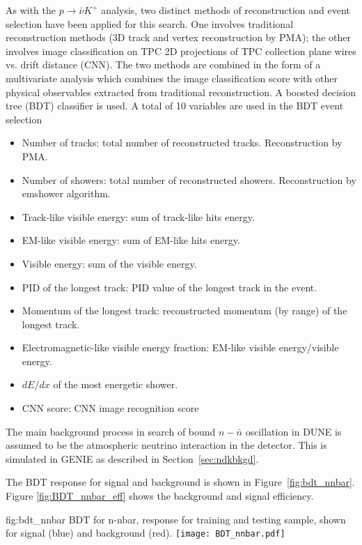As with the $p\rightarrow \bar{\nu} K^{+}$ analysis, two distinct methods of reconstruction and event selection have been applied for this search. One involves traditional reconstruction methods (3D track and vertex reconstruction by PMA); the other involves image classification on TPC 2D projections of TPC collection plane wires vs. drift distance (CNN). The two methods are combined in the form of a multivariate analysis which combines the image classification score with other physical observables extracted from traditional reconstruction.  A boosted decision tree (BDT) classifier is used. A total of 10 variables are used in the BDT event selection
 \begin{itemize}
  \item Number of tracks: total number of reconstructed tracks. Reconstruction by PMA.
  \item Number of showers: total number of reconstructed showers. Reconstruction by emshower algorithm. 
  \item Track-like visible energy: sum of track-like hits energy.
  \item EM-like visible energy: sum of EM-like hits energy.
  \item Visible energy: sum of the visible energy.
  \item PID of the longest track: PID value of the longest track in the event.
  \item Momentum of the longest track: reconstructed momentum (by range) of the longest track.
  \item Electromagnetic-like visible energy fraction: EM-like visible energy/visible energy.
  \item $dE/dx$ of the most energetic shower. 
  \item CNN score: CNN image recognition score
 \end{itemize}

The main background process in search of bound $n-\bar{n}$ oscillation in DUNE is assumed to be the atmospheric neutrino interaction in the detector.  This is simulated in GENIE as described in Section~\ref{sec:ndkbkgd}.

The BDT response for signal and background is shown in Figure~\ref{fig:bdt_nnbar}. Figure \ref{fig:BDT_nnbar_eff} shows the background and signal efficiency. 

\begin{dunefigure}
{fig:bdt_nnbar}
{BDT for n-nbar, response for training and testing sample, shown for signal (blue) and background (red).}
\texttt{[image: BDT\_nnbar.pdf]}
\end{dunefigure} 

